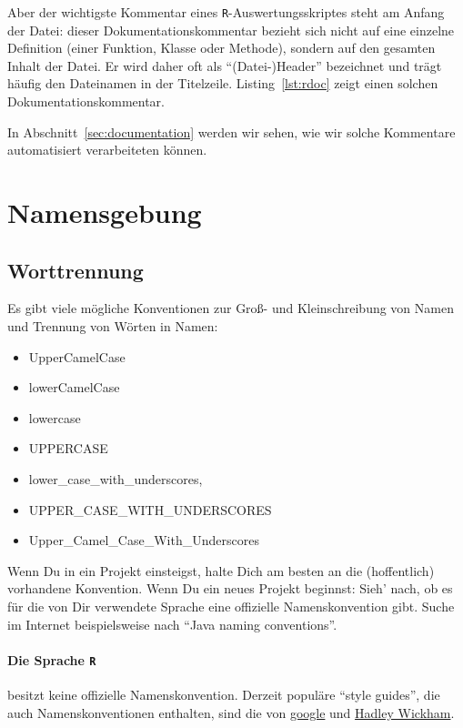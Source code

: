 \documentclass[twoside]{scrreprt}
\providecommand{\R}{\texttt{R}}
\begin{document}
Aber der wichtigste Kommentar eines \R{}-Auswertungsskriptes steht 
am Anfang der Datei: dieser Dokumentationskommentar bezieht sich nicht auf eine
einzelne Definition (einer Funktion, Klasse oder Methode), sondern auf den
gesamten Inhalt der
Datei. Er wird daher oft als "`(Datei-)Header"' bezeichnet und tr\"a{}gt
h\"a{}ufig den Dateinamen in der Titelzeile.
Listing~\ref{lst:rdoc} zeigt einen solchen Dokumentationskommentar.


In Abschnitt~\ref{sec:documentation} werden wir sehen, wie wir solche
Kommentare automatisiert verarbeiteten k\"o{}nnen.


\section{Namensgebung\label{sec:naming}}
\subsection{Worttrennung}
Es gibt viele m\"o{}gliche Konventionen zur Gro\ss{}- und Kleinschreibung  von
Namen und
Trennung von W\"o{}rten in Namen:
\begin{itemize}
\item UpperCamelCase
\item lowerCamelCase
\item lowercase
\item UPPERCASE
\item lower\_case\_with\_underscores,
\item UPPER\_CASE\_WITH\_UNDERSCORES
\item Upper\_Camel\_Case\_With\_Underscores
\end{itemize}
Wenn Du in ein Projekt einsteigst, halte Dich am besten an die (hoffentlich)
vorhandene Konvention.
Wenn Du ein neues Projekt beginnst: Sieh' nach, ob es f\"u{}r die von Dir
verwendete Sprache eine offizielle Namenskonvention gibt. Suche im Internet
beispielsweise nach "`Java naming conventions"'.

\paragraph{Die Sprache \R{}} besitzt keine offizielle
Namenskonvention. Derzeit
popul\"a{}re "`style guides"', die auch Namenskonventionen enthalten, sind die
von
\href{https://google-styleguide.googlecode.com/svn/trunk/Rguide.xml}{google} und
\href{http://adv-r.had.co.nz/Style.html}{Hadley Wickham}.
\end{document}
